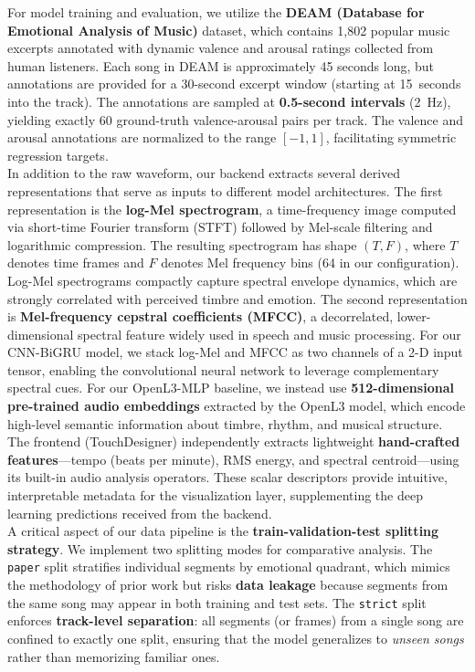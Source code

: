 \documentclass[12pt,a4paper]{article}
\begin{document}
For model training and evaluation, we utilize the \textbf{DEAM (Database for Emotional Analysis of Music)} dataset, which contains 1,802 popular music excerpts annotated with dynamic valence and arousal ratings collected from human listeners. Each song in DEAM is approximately 45 seconds long, but annotations are provided for a 30-second excerpt window (starting at 15~seconds into the track). The annotations are sampled at \textbf{0.5-second intervals} (2~Hz), yielding exactly 60 ground-truth valence-arousal pairs per track. The valence and arousal annotations are normalized to the range $[-1, 1]$, facilitating symmetric regression targets. \\

In addition to the raw waveform, our backend extracts several derived representations that serve as inputs to different model architectures. The first representation is the \textbf{log-Mel spectrogram}, a time-frequency image computed via short-time Fourier transform (STFT) followed by Mel-scale filtering and logarithmic compression. The resulting spectrogram has shape $(T, F)$, where $T$ denotes time frames and $F$ denotes Mel frequency bins (64 in our configuration). Log-Mel spectrograms compactly capture spectral envelope dynamics, which are strongly correlated with perceived timbre and emotion. The second representation is \textbf{Mel-frequency cepstral coefficients (MFCC)}, a decorrelated, lower-dimensional spectral feature widely used in speech and music processing. For our CNN-BiGRU model, we stack log-Mel and MFCC as two channels of a 2-D input tensor, enabling the convolutional neural network to leverage complementary spectral cues. For our OpenL3-MLP baseline, we instead use \textbf{512-dimensional pre-trained audio embeddings} extracted by the OpenL3 model, which encode high-level semantic information about timbre, rhythm, and musical structure. The frontend (TouchDesigner) independently extracts lightweight \textbf{hand-crafted features}---tempo (beats per minute), RMS energy, and spectral centroid---using its built-in audio analysis operators. These scalar descriptors provide intuitive, interpretable metadata for the visualization layer, supplementing the deep learning predictions received from the backend. \\

A critical aspect of our data pipeline is the \textbf{train-validation-test splitting strategy}. We implement two splitting modes for comparative analysis. The \texttt{paper} split stratifies individual segments by emotional quadrant, which mimics the methodology of prior work but risks \textbf{data leakage} because segments from the same song may appear in both training and test sets. The \texttt{strict} split enforces \textbf{track-level separation}: all segments (or frames) from a single song are confined to exactly one split, ensuring that the model generalizes to \textit{unseen songs} rather than memorizing familiar ones.
\end{document}
